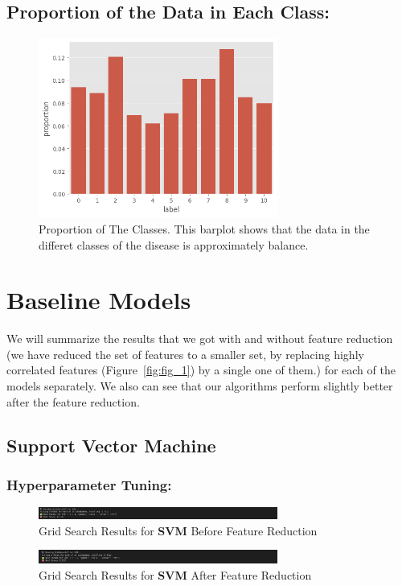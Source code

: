 \documentclass[a4paper,12pt]{article}
\begin{document}
\subsection{Proportion of the Data in Each Class:}
\begin{figure}[H]
    \centering
    \includegraphics[width=0.7\textwidth]{./images/class_proror.png}
    \caption{Proportion of The Classes. This barplot shows that the data in the differet classes of the disease is approximately balance.}
    \label{fig:fig_2}
\end{figure}


\section{Baseline Models}
We will summarize the results that we got with and without feature reduction (we have reduced the set of features to a smaller set, by replacing highly correlated features (Figure~\ref{fig:fig_1}) by a single one of them.) for each of the models separately.
We also can see that our algorithms perform slightly better after the feature reduction.

\subsection{Support Vector Machine}
\subsubsection{Hyperparameter Tuning:}
\begin{figure}[H]
    \centering
    \includegraphics[width=0.7\textwidth]{./images/gssvm1.png}
    \caption{Grid Search Results for \textbf{SVM} Before Feature Reduction}
    \label{fig:fig_3}
\end{figure}
\begin{figure}[H]
    \centering
    \includegraphics[width=0.7\textwidth]{./images/gssvm2.png}
    \caption{Grid Search Results for \textbf{SVM} After Feature Reduction}
    \label{fig:fig_4}
\end{figure}
\end{document}

